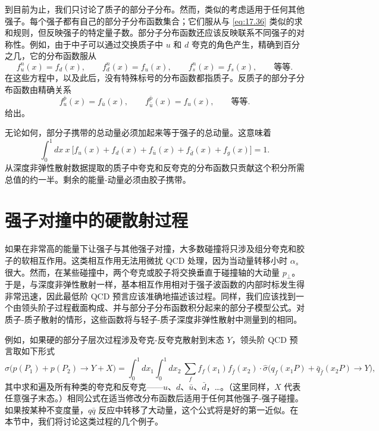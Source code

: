到目前为止，我们只讨论了质子的部分子分布。然而，类似的考虑适用于任何其他强子。每个强子都有自己的部分子分布函数集合；它们服从与 \eqref{eq:17.36} 类似的求和规则，但反映强子的特定量子数。部分子分布函数还应该反映联系不同强子的对称性。例如，由于中子可以通过交换质子中 $u$ 和 $d$ 夸克的角色产生，精确到百分之几，它的分布函数服从
\begin{equation}
  f_u^n(x) = f_d(x),\qquad f_d^n(x) = f_u(x),\qquad
  f_s^n(x) = f_s(x),\qquad \text{等等}.
  \label{eq:17.37}
\end{equation}
在这些方程中，以及此后，没有特殊标号的分布函数都指质子。反质子的部分子分布函数由精确关系
\begin{equation}
  f_u^{\bar{p}}(x) = f_{\bar{u}}(x),\qquad
  f_{\bar{u}}^{\bar{p}}(x) = f_u(x),\qquad \text{等等}.
  \label{eq:17.38}
\end{equation}
给出。

无论如何，部分子携带的总动量必须加起来等于强子的总动量。这意味着
\begin{equation}
  \int_0^1 dx\ x\ \bigl[ f_u(x) + f_d(x) + f_{\bar{u}}(x) + f_{\bar{d}}(x)
    + f_g(x) \bigr] = 1 .
  \label{eq:17.39}
\end{equation}
从深度非弹性散射数据提取的质子中夸克和反夸克的分布函数只贡献这个积分所需总值的约一半。剩余的能量-动量必须由胶子携带。

\section{强子对撞中的硬散射过程}

如果在非常高的能量下让强子与其他强子对撞，大多数碰撞将只涉及组分夸克和胶子的软相互作用。这类相互作用无法用微扰 QCD 处理，因为当动量转移小时 $\alpha_s$ 很大。然而，在某些碰撞中，两个夸克或胶子将交换垂直于碰撞轴的大动量 $p_\perp$。于是，与深度非弹性散射一样，基本相互作用相对于强子波函数的内部时标发生得非常迅速，因此最低阶 QCD 预言应该准确地描述该过程。同样，我们应该找到一个由领头阶子过程截面构成、并与部分子分布函数积分起来的部分子模型公式。对质子-质子散射的情形，这些函数将与轻子-质子深度非弹性散射中测量到的相同。

例如，如果硬的部分子层次过程涉及夸克-反夸克散射到末态 $Y$，领头阶 QCD 预言取如下形式
\begin{equation}
  \sigma\bigl( p(P_1) + p(P_2) \to Y + X \bigr)
  = \int_0^1 dx_1 \int_0^1 dx_2\ \sum_f f_f(x_1)f_{\bar{f}}(x_2)\cdot
    \hat{\sigma}\bigl( q_f(x_1P) + \bar{q}_{\bar{f}}(x_2P) \to Y \bigr) ,
  \label{eq:17.40}
\end{equation}
其中求和遍及所有种类的夸克和反夸克——$u$、$d$、$\bar{u}$、$\bar{d}$，\ldots。（这里同样，$X$ 代表任意强子末态。）相同公式在适当修改分布函数后适用于任何其他强子-强子碰撞。如果按某种不变度量，$q\bar{q}$ 反应中转移了大动量，这个公式将是好的第一近似。在本节中，我们将讨论这类过程的几个例子。


